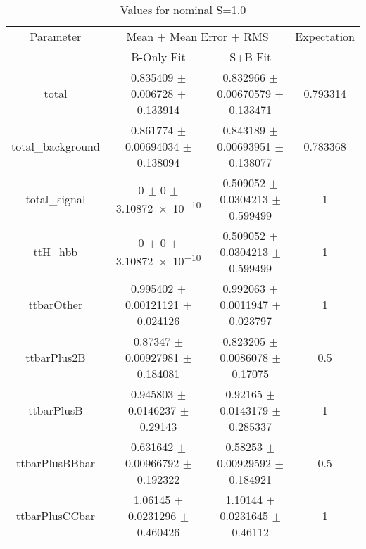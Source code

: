 \begin{table}
\centering
\caption{Values for nominal S=1.0}
\begin{tabular}{cccc}
\toprule
Parameter & \multicolumn{2}{c}{Mean $\pm$ Mean Error $\pm$ RMS} & Expectation\\
 & B-Only Fit & S+B Fit & \\
\midrule
total & \num{0.835409} $\pm$ \num{0.006728} $\pm$ \num{0.133914} & \num{0.832966} $\pm$ \num{0.00670579} $\pm$ \num{0.133471} & \num{0.793314}\\
total\_background & \num{0.861774} $\pm$ \num{0.00694034} $\pm$ \num{0.138094} & \num{0.843189} $\pm$ \num{0.00693951} $\pm$ \num{0.138077} & \num{0.783368}\\
total\_signal & \num{0} $\pm$ \num{0} $\pm$ \num{3.10872e-10} & \num{0.509052} $\pm$ \num{0.0304213} $\pm$ \num{0.599499} & \num{1}\\
ttH\_hbb & \num{0} $\pm$ \num{0} $\pm$ \num{3.10872e-10} & \num{0.509052} $\pm$ \num{0.0304213} $\pm$ \num{0.599499} & \num{1}\\
ttbarOther & \num{0.995402} $\pm$ \num{0.00121121} $\pm$ \num{0.024126} & \num{0.992063} $\pm$ \num{0.0011947} $\pm$ \num{0.023797} & \num{1}\\
ttbarPlus2B & \num{0.87347} $\pm$ \num{0.00927981} $\pm$ \num{0.184081} & \num{0.823205} $\pm$ \num{0.0086078} $\pm$ \num{0.17075} & \num{0.5}\\
ttbarPlusB & \num{0.945803} $\pm$ \num{0.0146237} $\pm$ \num{0.29143} & \num{0.92165} $\pm$ \num{0.0143179} $\pm$ \num{0.285337} & \num{1}\\
ttbarPlusBBbar & \num{0.631642} $\pm$ \num{0.00966792} $\pm$ \num{0.192322} & \num{0.58253} $\pm$ \num{0.00929592} $\pm$ \num{0.184921} & \num{0.5}\\
ttbarPlusCCbar & \num{1.06145} $\pm$ \num{0.0231296} $\pm$ \num{0.460426} & \num{1.10144} $\pm$ \num{0.0231645} $\pm$ \num{0.46112} & \num{1}\\
\bottomrule
\end{tabular}
\end{table}